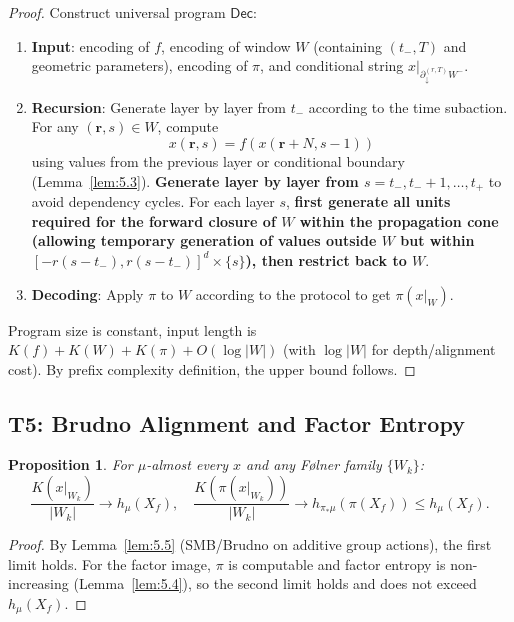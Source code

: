 \documentclass[11pt]{article}
\newtheorem{proposition}[theorem]{Proposition}
\theoremstyle{definition}
\theoremstyle{remark}
\begin{document}
\begin{proof}
Construct universal program \( \mathsf{Dec} \):

\begin{enumerate}
\item \textbf{Input}: encoding of \( f \), encoding of window \( W \) (containing \( (t_-, T) \) and geometric parameters), encoding of \( \pi \), and conditional string \( x|_{\partial_\downarrow^{(r,T)} W^-} \).
\item \textbf{Recursion}: Generate layer by layer from \( t_- \) according to the time subaction. For any \( (\mathbf{r}, s) \in W \), compute
\[
x(\mathbf{r}, s) = f(x(\mathbf{r} + N, s-1))
\]
using values from the previous layer or conditional boundary (Lemma~\ref{lem:5.3}). \textbf{Generate layer by layer from \( s = t_-, t_- + 1, \dots, t_+ \)} to avoid dependency cycles. For each layer \( s \), \textbf{first generate all units required for the forward closure of \( W \) within the propagation cone (allowing temporary generation of values outside \( W \) but within \( [-r(s - t_-), r(s - t_-)]^d \times \{s\} \)), then restrict back to \( W \)}.
\item \textbf{Decoding}: Apply \( \pi \) to \( W \) according to the protocol to get \( \pi(x|_W) \).
\end{enumerate}

Program size is constant, input length is \( K(f) + K(W) + K(\pi) + O(\log |W|) \) (with \( \log |W| \) for depth/alignment cost). By prefix complexity definition, the upper bound follows.
\end{proof}

\subsection{T5: Brudno Alignment and Factor Entropy}

\begin{proposition}\label{thm:T5}
For \( \mu \)-almost every \( x \) and any Følner family \( \{W_k\} \):
\[
\frac{K(x|_{W_k})}{|W_k|} \to h_\mu(X_f), \quad \frac{K(\pi(x|_{W_k}))}{|W_k|} \to h_{\pi_* \mu}(\pi(X_f)) \leq h_\mu(X_f).
\]
\end{proposition}

\begin{proof}
By Lemma~\ref{lem:5.5} (SMB/Brudno on additive group actions), the first limit holds. For the factor image, \( \pi \) is computable and factor entropy is non-increasing (Lemma~\ref{lem:5.4}), so the second limit holds and does not exceed \( h_\mu(X_f) \).
\end{proof}
\end{document}
